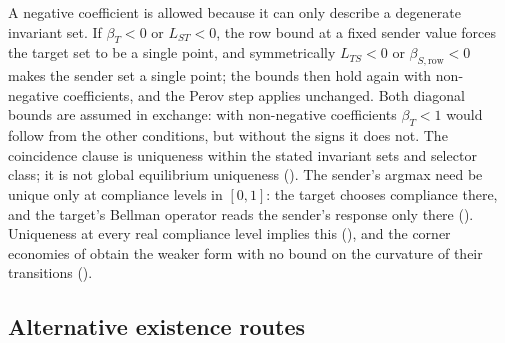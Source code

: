 A negative coefficient is allowed because it can only describe a degenerate
invariant set. If $\beta_T<0$ or $L_{ST}<0$, the row bound at a fixed sender value
forces the target set to be a single point, and symmetrically
$L_{TS}<0$ or $\beta_{S,\mathrm{row}}<0$ makes the sender set a single
point; the bounds then hold again with non-negative coefficients, and the
Perov step applies unchanged. Both diagonal bounds are assumed in exchange:
with non-negative coefficients $\beta_T<1$ would follow from the other
conditions, but without the signs it does not. The coincidence clause is
uniqueness within the stated invariant sets and selector class; it is not global
equilibrium uniqueness ().
The sender's argmax need be unique only at compliance levels in $[0,1]$: the
target chooses compliance there, and the target's Bellman operator reads the
sender's response only there (). Uniqueness
at every real compliance level implies this (),
and the corner economies of  obtain the weaker
form with no bound on the curvature of their transitions
().

\subsection{Alternative existence routes}


